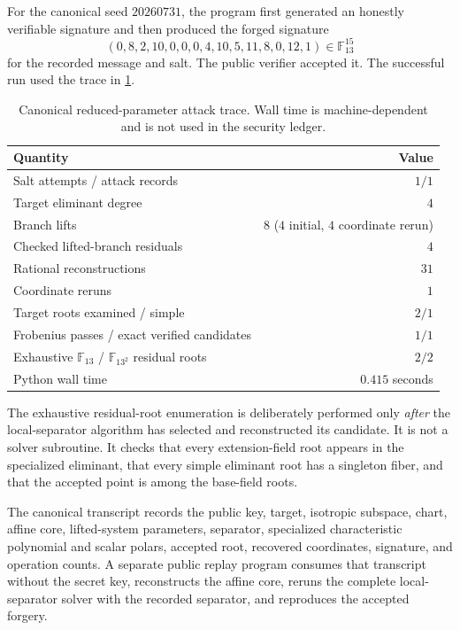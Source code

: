 \documentclass[11pt,a4paper]{article}
\theoremstyle{definition}
\theoremstyle{remark}
\newcommand{\F}{\mathbb F}
\begin{document}
For the canonical seed $20260731$, the program first generated an honestly verifiable signature and then produced the forged signature
\[
 (0,8,2,10,0,0,0,4,10,5,11,8,0,12,1)
 \in\F_{13}^{15}
\]
for the recorded message and salt.  The public verifier accepted it.  The successful run used the trace in \cref{tab:toytrace}.

\begin{table}[ht]
\centering
\caption{Canonical reduced-parameter attack trace.  Wall time is machine-dependent and is not used in the security ledger.}
\label{tab:toytrace}
\begin{tabular}{@{}lr@{}}
\toprule
Quantity & Value\\
\midrule
Salt attempts / attack records & $1/1$\\
Target eliminant degree & $4$\\
Branch lifts & $8$ ($4$ initial, $4$ coordinate rerun)\\
Checked lifted-branch residuals & $4$\\
Rational reconstructions & $31$\\
Coordinate reruns & $1$\\
Target roots examined / simple & $2/1$\\
Frobenius passes / exact verified candidates & $1/1$\\
Exhaustive $\F_{13}$ / $\F_{13^2}$ residual roots & $2/2$\\
Python wall time & $0.415$ seconds\\
\bottomrule
\end{tabular}
\end{table}

The exhaustive residual-root enumeration is deliberately performed only \emph{after} the local-separator algorithm has selected and reconstructed its candidate.  It is not a solver subroutine.  It checks that every extension-field root appears in the specialized eliminant, that every simple eliminant root has a singleton fiber, and that the accepted point is among the base-field roots.

The canonical transcript records the public key, target, isotropic subspace, chart, affine core, lifted-system parameters, separator, specialized characteristic polynomial and scalar polars, accepted root, recovered coordinates, signature, and operation counts.  A separate public replay program consumes that transcript without the secret key, reconstructs the affine core, reruns the complete local-separator solver with the recorded separator, and reproduces the accepted forgery.
\end{document}

